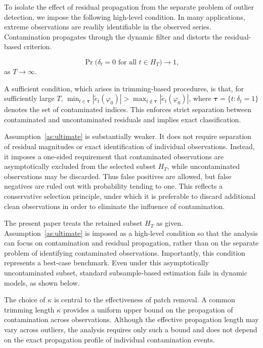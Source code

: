 \documentclass[12pt]{article}
\numberwithin{equation}{section}
\begin{document}
To isolate the effect of residual propagation from the separate problem of outlier detection, we impose the following high-level condition.
In many applications, extreme observations are readily identifiable in the observed series. 
Contamination propagates through the dynamic filter and distorts the residual-based criterion.
\begin{assumption}\label{as:ultimate}
\begin{equation}
\Pr\big( \delta_t = 0 \text{ for all } t \in H_T \big) \longrightarrow 1,
\end{equation}
as $T \to \infty$.
\end{assumption}

A sufficient condition, which arises in trimming-based procedures, is that, for sufficiently large $T$,
$\min_{t \in \boldsymbol{\tau}} |\tilde{e}_t(\varphi_0)|
>
\max_{t \notin \boldsymbol{\tau}} |\tilde{e}_t(\varphi_0)|$,
where $\boldsymbol{\tau} = \{t : \delta_t = 1\}$ denotes the set of contaminated indices. 
This enforces strict separation between contaminated and uncontaminated residuals and implies exact classification.

Assumption~\ref{as:ultimate} is substantially weaker. 
It does not require separation of residual magnitudes or exact identification of individual observations. 
Instead, it imposes a one-sided requirement that contaminated observations are asymptotically excluded from the selected subset $H_T$, while uncontaminated observations may be discarded.
Thus false positives are allowed, but false negatives are ruled out with probability tending to one. 
This reflects a conservative selection principle, under which it is preferable to discard additional clean observations in order to eliminate the influence of contamination.

The present paper treats the retained subset $H_T$ as given.
Assumption~\ref{as:ultimate} is imposed as a high-level condition so that the analysis can focus on contamination and residual propagation, rather than on the separate problem of identifying contaminated observations.
Importantly, this condition represents a best-case benchmark. 
Even under this asymptotically uncontaminated subset, standard subsample-based estimation fails in dynamic models, as shown below.

The choice of $\kappa$ is central to the effectiveness of patch removal. 
A common trimming length $\kappa$ provides a uniform upper bound on the propagation of contamination across observations. 
Although the effective propagation length may vary across outliers, the analysis requires only such a bound and does not depend on the exact propagation profile of individual contamination events.
\end{document}
